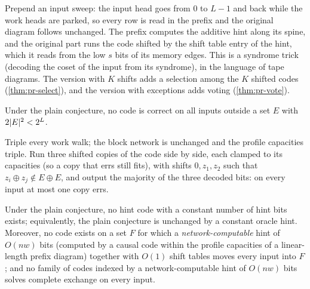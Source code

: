 \begin{outline}
Prepend an input sweep: the input head goes from $0$ to $L-1$ and back while the work heads are
parked, so every row is read in the prefix and the original diagram follows unchanged. The prefix
computes the additive hint along its spine, and the original part runs the code shifted by the shift
table entry of the hint, which it reads from the low $s$ bits of its memory edges. This is a syndrome trick (decoding the coset of the input from its syndrome), in the language of tape
diagrams. The version with
$K$ shifts adds a selection among the $K$ shifted codes (\cref{thm:pr-select}), and the version with
exceptions adds voting (\cref{thm:pr-vote}).
\end{outline}

\begin{theorem}\label{thm:pr-vote}
Under the plain conjecture, no code is correct on all inputs outside a set $E$ with
$2\lvert E \rvert^2<2^L$.
\end{theorem}

\begin{outline}
Triple every work walk; the block network is unchanged and the profile capacities triple. Run three
shifted copies of the code side by side, each clamped to its capacities (so a copy that errs still fits),
with shifts $0,z_1,z_2$ such that $z_i\oplus z_j\notin E\oplus E$, and output the majority of the three
decoded bits: on every input at most one copy errs.
\end{outline}

\begin{theorem}\label{thm:pr-select}
Under the plain conjecture, no hint code with a constant number of hint bits exists; equivalently, the
plain conjecture is unchanged by a constant oracle hint. Moreover, no code exists on a set $F$
for which a \emph{network-computable} hint of $O(nw)$ bits (computed by a causal code within the profile capacities of
a linear-length prefix diagram) together with $O(1)$ shift tables moves every input into $F$; and no
family of codes indexed by a network-computable hint of $O(nw)$ bits solves complete exchange on every
input.
\end{theorem}

